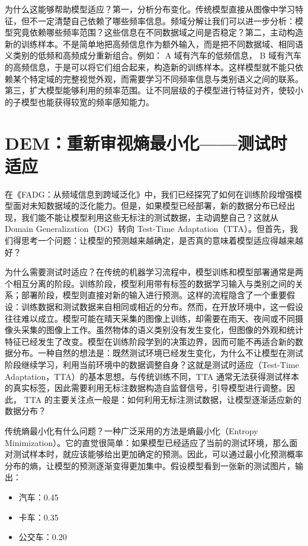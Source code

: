为什么这能够帮助模型适应？第一，分析分布变化。传统模型直接从图像中学习特征，但不一定清楚自己依赖了哪些频率信息。频域分解让我们可以进一步分析：模型究竟依赖哪些频率范围？这些信息在不同数据域之间是否稳定？第二，主动构造新的训练样本。不是简单地把高频信息作为额外输入，而是把不同数据域、相同语义类别的低频和高频成分重新组合。例如： A 域有汽车的低频信息， B 域有汽车的高频信息，于是可以将它们组合起来，构造新的训练样本。这样模型就不能只依赖某个特定域的完整视觉外观，而需要学习不同频率信息与类别语义之间的联系。第三，扩大模型能够利用的频率范围。让不同层级的子模型进行特征对齐，使较小的子模型也能获得较宽的频率感知能力。

\section{DEM：重新审视熵最小化——测试时适应}

在《FADG：从频域信息到跨域泛化》中，我们已经探究了如何在训练阶段增强模型面对未知数据域的泛化能力。但是，如果模型已经部署，新的数据分布已经出现，我们能不能让模型利用这些无标注的测试数据，主动调整自己？这就从 Domain Generalization（DG）转向 Test-Time Adaptation（TTA）。但首先，我们得思考一个问题：让模型的预测越来越确定，是否真的意味着模型适应得越来越好？

为什么需要测试时适应？在传统的机器学习流程中，模型训练和模型部署通常是两个相互分离的阶段。训练阶段，模型利用带有标签的数据学习输入与类别之间的关系；部署阶段，模型则直接对新的输入进行预测。这样的流程隐含了一个重要假设：训练数据和测试数据来自相同或相近的分布。然而，在开放环境中，这一假设往往难以成立。模型可能在晴天采集的图像上训练，却需要在雨天、夜间或不同摄像头采集的图像上工作。虽然物体的语义类别没有发生变化，但图像的外观和统计特征已经发生了改变。模型在训练阶段学到的决策边界，因而可能不再适合新的数据分布。一种自然的想法是：既然测试环境已经发生变化，为什么不让模型在测试阶段继续学习，利用当前环境中的数据调整自身？这就是测试时适应（Test-Time Adaptation，TTA）的基本思想。与传统训练不同，TTA 通常无法获得测试样本的真实标签，因此需要利用无标注数据构造自监督信号，引导模型进行调整。因此， TTA 的主要关注点一般是：如何利用无标注测试数据，让模型逐渐适应新的数据分布？

传统熵最小化有什么问题？一种广泛采用的方法是熵最小化（Entropy Minimization）。它的直觉很简单：如果模型已经适应了当前的测试环境，那么面对测试样本时，就应该能够给出更加确定的预测。因此，可以通过最小化预测概率分布的熵，让模型的预测逐渐变得更加集中。假设模型看到一张新的测试图片，输出：

\begin{itemize}
  \item 汽车：0.45
  \item 卡车：0.35
  \item 公交车：0.20
\end{itemize}

